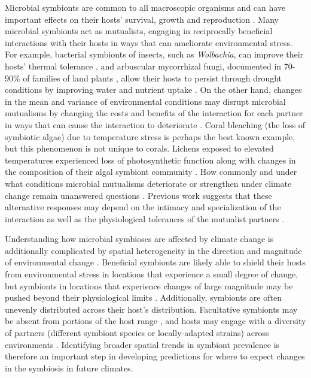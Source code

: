 \documentclass[11pt]{article}
\let\cite\citep
\begin{document}
Microbial symbionts are common to all macroscopic organisms and can have important effects on their hosts' survival, growth and reproduction \cite{rodriguez2009fungal,mcfall2013animals}.
Many microbial symbionts act as mutualists, engaging in reciprocally beneficial interactions with their hosts in ways that can ameliorate environmental stress. 
For example, bacterial symbionts of insects, such as \emph{Wolbachia}, can improve their hosts' thermal tolerance \citep{truitt2019wolbachia, renoz2019evolutionary}, and arbuscular mycorrhizal fungi, documented in 70-90\% of families of land plants \citep{parniske2008arbuscular}, allow their hosts to persist through drought conditions by improving water and nutrient uptake \citep{cheng2021elucidating}.
On the other hand, changes in the mean and variance of environmental conditions may disrupt microbial  mutualisms by changing the costs and benefits of the interaction for each partner in ways that can cause the interaction to deteriorate \citep{aslan2013mutualism, fowler2024microbial}. 
Coral bleaching (the loss of symbiotic algae) due to temperature stress \citep{sully2019global} is perhaps the best known example, but this phenomenon is not unique to corals.
Lichens exposed to elevated temperatures experienced loss of photosynthetic function along with changes in the composition of their algal symbiont community \citep{meyer2022climate}.
How commonly and under what conditions microbial mutualisms deteriorate or strengthen under climate change remain unanswered questions \citep{frederickson2017mutualisms}.
Previous work suggests that these alternative responses may depend on the intimacy and specialization of the interaction as well as the physiological tolerances of the mutualist partners \citep{toby2010mutualisms, warren2014mutualism, rafferty2015phenological}. 

Understanding how microbial symbioses are affected by climate change is additionally complicated by spatial heterogeneity in the direction and magnitude of environmental change \cite{ipcc_2021}. 
Beneficial symbionts are likely able to shield their hosts from environmental stress in locations that experience a small degree of change, but symbionts in locations that experience changes of large magnitude may be pushed beyond their physiological limits \cite{webster2008temperature}.
Additionally, symbionts are often unevenly distributed across their host's distribution.
Facultative symbionts may be absent from portions of the host range \cite{afkhami2014mutualist}, and hosts may engage with a diversity of partners (different symbiont species or locally-adapted strains) across environments \cite{frade2008variation, rolshausen2018quantifying, fowler2023geographic}.
Identifying broader spatial trends in symbiont prevalence is therefore an important step in developing predictions for where to expect changes in the symbiosis in future climates.
\end{document}
